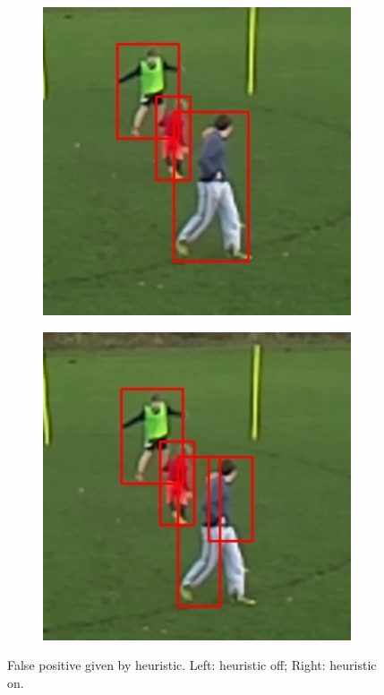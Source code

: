 \documentclass{article}
\begin{document}
\begin{figure}[h!]
  \begin{subfigure}[b]{0.5\linewidth}
  \centering
	\includegraphics[scale=0.4]{report/pic/3_new/heu_false_off.jpg} 
  \end{subfigure}
  \begin{subfigure}[b]{0.5\linewidth}
  \centering
	\includegraphics[scale=0.4]{report/pic/3_new/heu_false_on.jpg} 
  \end{subfigure}
  \caption{False positive given by heuristic. Left: heuristic off; Right: heuristic on.}
\end{figure}
\end{document}
